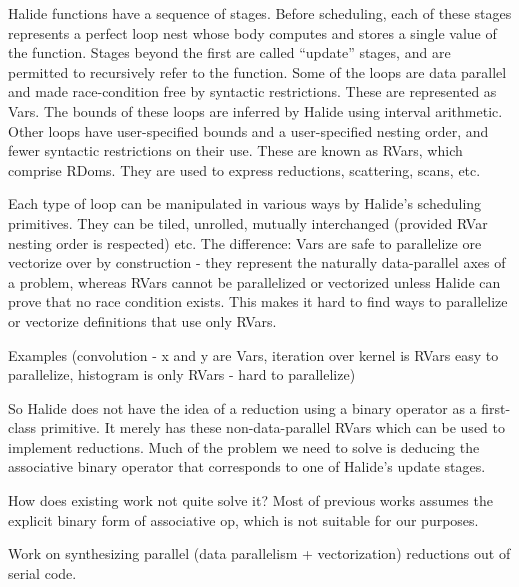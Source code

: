 Halide functions have a sequence of stages. Before scheduling, each of these stages represents a perfect loop nest whose body computes and stores a single value of the function. Stages beyond the first are called ``update'' stages, and are permitted to recursively refer to the function. Some of the loops are data parallel and made race-condition free by syntactic restrictions. These are represented as Vars. The bounds of these loops are inferred by Halide using interval arithmetic. Other loops have user-specified bounds and a user-specified nesting order, and fewer syntactic restrictions on their use. These are known as RVars, which comprise RDoms. They are used to express reductions, scattering, scans, etc. 

Each type of loop can be manipulated in various ways by Halide's scheduling primitives. They can be tiled, unrolled, mutually interchanged (provided RVar nesting order is respected) etc. The difference: Vars are safe to parallelize ore vectorize over by construction - they represent the naturally data-parallel axes of a problem, whereas RVars cannot be parallelized or vectorized unless Halide can prove that no race condition exists. This makes it hard to find ways to parallelize or vectorize definitions that use only RVars.

Examples (convolution - x and y are Vars, iteration over kernel is RVars easy to parallelize, histogram is only RVars - hard to parallelize)

So Halide does not have the idea of a reduction using a binary operator as a first-class primitive. It merely has these non-data-parallel RVars which can be used to implement reductions. Much of the problem we need to solve is deducing the associative binary operator that corresponds to one of Halide's update stages.

How does existing work not quite solve it? Most of previous works assumes the explicit binary form of associative op, which is not suitable for our purposes.

Work on synthesizing parallel (data parallelism + vectorization) reductions out of serial code. \\

